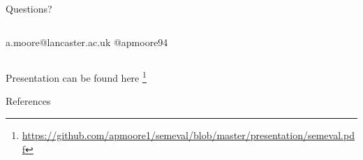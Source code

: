 \documentclass[10pt]{beamer}
\begin{document}
%
%




\begin{frame}[plain]
\begin{center}
\begin{center}
\huge Questions?
\end{center}
\begin{center}
\begin{columns}[T,onlytextwidth]
\centering
\normalsize a.moore@lancaster.ac.uk
\centering
\normalsize @apmoore94
\end{columns}
\end{center}
\end{center}

\begin{center}
\begin{center}
\small Presentation can be found here \footnote{\url{https://github.com/apmoore1/semeval/blob/master/presentation/semeval.pdf}}
\end{center}
\end{center}

\end{frame}


\appendix
\begin{frame}{References}
  \printbibliography[heading=none]
\end{frame}
\end{document}
